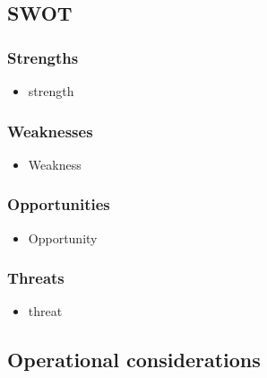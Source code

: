 \documentclass[10pt,a4paper]{article}
\begin{document}
\subsection{SWOT}
\subsubsection{Strengths}
	\begin{itemize}
 		\item strength  
	\end{itemize}
	
\subsubsection{Weaknesses}	
	 	\begin{itemize}
			\item Weakness
		\end{itemize}

\subsubsection{Opportunities}	
	 	\begin{itemize}
			\item Opportunity
		\end{itemize}
\subsubsection{Threats}	
	 	\begin{itemize}
			\item threat
		\end{itemize}

\subsection{Operational considerations}

\clearpage


 
\end{document}
